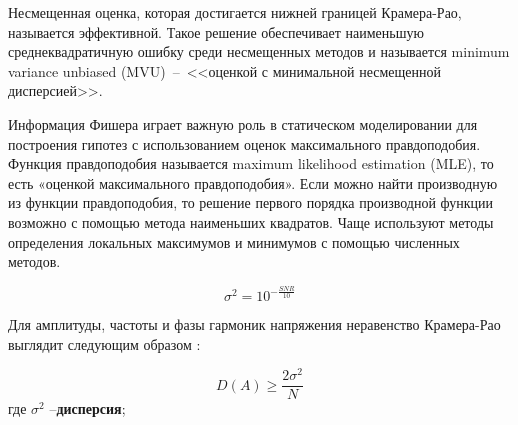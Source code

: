 




Несмещенная оценка, которая достигается нижней границей Крамера-Рао, называется эффективной. Такое решение обеспечивает наименьшую среднеквадратичную ошибку среди несмещенных методов и называется minimum variance unbiased (MVU)~--~<<оценкой с минимальной несмещенной дисперсией>>.

Информация Фишера играет важную роль в статическом моделировании для построения гипотез с использованием оценок максимального правдоподобия. Функция правдоподобия называется maximum likelihood estimation (MLE), то есть «оценкой максимального правдоподобия». Если можно найти производную из функции правдоподобия, то решение первого порядка производной функции возможно с помощью метода наименьших квадратов. Чаще используют методы определения локальных максимумов и минимумов с помощью численных методов.

\begin{equation}
	\label{eq:equation1.4.1}
	\sigma^2 = 10^{- \frac{SNR}{10}}
\end{equation}

Для амплитуды, частоты и фазы гармоник напряжения неравенство Крамера-Рао выглядит следующим образом \cite{kay1993fundamentals}:

\begin{equation}
	\label{eq:equation1.4.2}
	D(A) \geqslant \frac{2 \sigma^2}{N}
\end{equation}
где $\sigma^2$ --\textbf{дисперсия};

